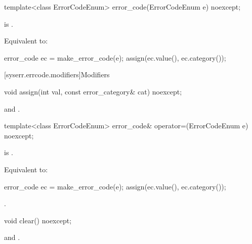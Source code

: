 %
\begin{itemdecl}
template<class ErrorCodeEnum>
  error_code(ErrorCodeEnum e) noexcept;
\end{itemdecl}

\begin{itemdescr}
\pnum
\constraints
{} is .

\pnum
\effects
Equivalent to:
\begin{codeblock}
error_code ec = make_error_code(e);
assign(ec.value(), ec.category());
\end{codeblock}
\end{itemdescr}

[syserr.errcode.modifiers]{Modifiers}

%
\begin{itemdecl}
void assign(int val, const error_category& cat) noexcept;
\end{itemdecl}

\begin{itemdescr}
\pnum
\ensures
{} and .
\end{itemdescr}

%
\begin{itemdecl}
template<class ErrorCodeEnum>
  error_code& operator=(ErrorCodeEnum e) noexcept;
\end{itemdecl}

\begin{itemdescr}
\pnum
\constraints
{} is .

\pnum
\effects
Equivalent to:
\begin{codeblock}
error_code ec = make_error_code(e);
assign(ec.value(), ec.category());
\end{codeblock}

\pnum
\returns
{}.
\end{itemdescr}

%
\begin{itemdecl}
void clear() noexcept;
\end{itemdecl}

\begin{itemdescr}
\pnum
\ensures
{} and .
\end{itemdescr}


